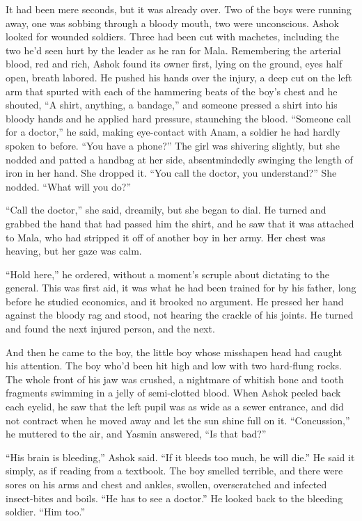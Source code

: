 It had been mere seconds, but it was already over. Two of the boys
were running away, one was sobbing through a bloody mouth, two were
unconscious. Ashok looked for wounded soldiers. Three had been cut
with machetes, including the two he'd seen hurt by the leader as he
ran for Mala. Remembering the arterial blood, red and rich, Ashok
found its owner first, lying on the ground, eyes half open, breath
labored. He pushed his hands over the injury, a deep cut on the
left arm that spurted with each of the hammering beats of the boy's
chest and he shouted, ``A shirt, anything, a bandage,'' and someone
pressed a shirt into his bloody hands and he applied hard pressure,
staunching the blood. ``Someone call for a doctor,'' he said, making
eye-contact with Anam, a soldier he had hardly spoken to before.
``You have a phone?'' The girl was shivering slightly, but she nodded
and patted a handbag at her side, absentmindedly swinging the
length of iron in her hand. She dropped it. ``You call the doctor,
you understand?'' She nodded. ``What will you do?''

``Call the doctor,'' she said, dreamily, but she began to dial. He
turned and grabbed the hand that had passed him the shirt, and he
saw that it was attached to Mala, who had stripped it off of
another boy in her army. Her chest was heaving, but her gaze was
calm.

``Hold here,'' he ordered, without a moment's scruple about dictating
to the general. This was first aid, it was what he had been trained
for by his father, long before he studied economics, and it brooked
no argument. He pressed her hand against the bloody rag and stood,
not hearing the crackle of his joints. He turned and found the next
injured person, and the next.

And then he came to the boy, the little boy whose misshapen head
had caught his attention. The boy who'd been hit high and low with
two hard-flung rocks. The whole front of his jaw was crushed, a
nightmare of whitish bone and tooth fragments swimming in a jelly
of semi-clotted blood. When Ashok peeled back each eyelid, he saw
that the left pupil was as wide as a sewer entrance, and did not
contract when he moved away and let the sun shine full on it.
``Concussion,'' he muttered to the air, and Yasmin answered, ``Is that
bad?''

``His brain is bleeding,'' Ashok said. ``If it bleeds too much, he
will die.'' He said it simply, as if reading from a textbook. The
boy smelled terrible, and there were sores on his arms and chest
and ankles, swollen, overscratched and infected insect-bites and
boils. ``He has to see a doctor.'' He looked back to the bleeding
soldier. ``Him too.''

